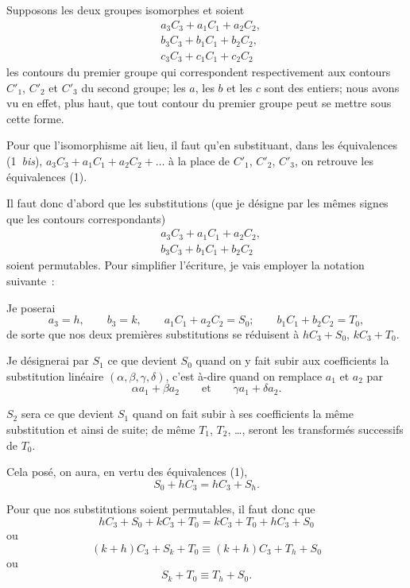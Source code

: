 \documentclass{article}
\begin{document}
Supposons les deux groupes isomorphes et soient
\[ \begin{aligned} &a_{3}C_{3} + a_{1}C_{1} + a_{2}C_{2},\\ &b_{3}C_{3} + b_{1}C_{1} + b_{2}C_{2},\\ &c_{3}C_{3} + c_{1}C_{1} + c_{2}C_{2} \end{aligned} \]
les contours du premier groupe qui correspondent respectivement aux contours $C'_{1}$, $C'_{2}$ et $C'_{3}$ du second groupe; les $a$, les $b$ et les $c$ sont des entiers; nous avons vu en effet, plus haut, que tout contour du premier groupe peut se mettre sous cette forme.

Pour que l'isomorphisme ait lieu, il faut qu'en substituant, dans les équivalences (1~\emph{bis}), $a_{3}C_{3} + a_{1}C_{1} + a_{2}C_{2} + \ldots$ à la place de $C'_{1}$, $C'_{2}$, $C'_{3}$, on retrouve les équivalences (1).

Il faut donc d'abord que les substitutions (que je désigne par les mêmes signes que les contours correspondants)
\[ \begin{aligned} &a_{3}C_{3} + a_{1}C_{1} + a_{2}C_{2},\\ &b_{3}C_{3} + b_{1}C_{1} + b_{2}C_{2} \end{aligned} \]
soient permutables. Pour simplifier l'écriture, je vais employer la notation suivante~:

Je poserai
\[ a_{3} = h, \qquad b_{3} = k, \qquad a_{1}C_{1} + a_{2}C_{2} = S_{0}; \qquad b_{1}C_{1} + b_{2}C_{2} = T_{0}, \]
de sorte que nos deux premières substitutions se réduisent à $hC_{3} + S_{0}$, $kC_{3} + T_{0}$.

Je désignerai par $S_{1}$ ce que devient $S_{0}$ quand on y fait subir aux coefficients la substitution linéaire $(\alpha, \beta, \gamma, \delta)$, c'est à-dire quand on remplace $a_{1}$ et $a_{2}$ par
\[ \alpha a_{1} + \beta a_{2} \qquad \text{et} \qquad \gamma a_{1} + \delta a_{2}. \]

$S_{2}$ sera ce que devient $S_{1}$ quand on fait subir à ses coefficients la même substitution et ainsi de suite; de même $T_{1}$, $T_{2}$, \ldots, seront les transformés successifs de $T_{0}$.

Cela posé, on aura, en vertu des équivalences (1),
\[ S_{0} + hC_{3} = hC_{3} + S_{h}. \]

Pour que nos substitutions soient permutables, il faut donc que
\[ hC_{3} + S_{0} + kC_{3} + T_{0} = kC_{3} + T_{0} + hC_{3} + S_{0} \]
ou
\[ (k + h)C_{3} + S_{k} + T_{0} \equiv (k + h)C_{3} + T_{h} + S_{0} \]
ou
\[ S_{k} + T_{0} \equiv T_{h} + S_{0}. \tag{$\lambda$} \]
\end{document}
